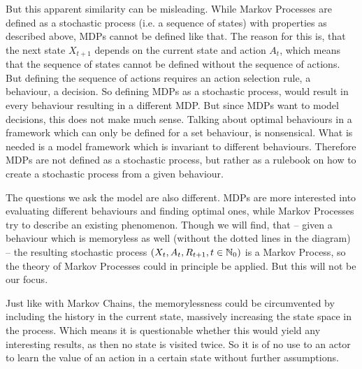 But this apparent similarity can be misleading. While Markov Processes are defined as a stochastic process (i.e. a sequence of states) with properties as described above, MDPs cannot be defined like that. The reason for this is, that the next state \(X_{t+1}\) depends on the current state and action \(A_{t}\), which means that the sequence of states cannot be defined without the sequence of actions. But defining the sequence of actions requires an action selection rule, a behaviour, a decision. So defining MDPs as a stochastic process, would result in every behaviour resulting in a different MDP. But since MDPs want to model decisions, this does not make much sense. Talking about optimal behaviours in a framework which can only be defined for a set behaviour, is nonsensical. What is needed is a model framework which is invariant to different behaviours. Therefore MDPs are not defined as a stochastic process, but rather as a rulebook on how to create a stochastic process from a given behaviour. 

The questions we ask the model are also different.  MDPs are more interested into evaluating different behaviours and finding optimal ones, while Markov Processes try to describe an existing phenomenon. Though we will find, that -- given a behaviour which is memoryless as well (without the dotted lines in the diagram) -- the resulting stochastic process \((X_t,A_t,R_{t+1},t\in\mathbb{N}_0)\) is a Markov Process, so the theory of Markov Processes could in principle be applied. But this will not be our focus. 

Just like with Markov Chains, the memorylessness could be circumvented by including the history in the current state, massively increasing the state space in the process. Which means it is questionable whether this would yield any interesting results, as then no state is visited twice. So it is of no use to an actor to learn the value of an action in a certain state without further assumptions.

